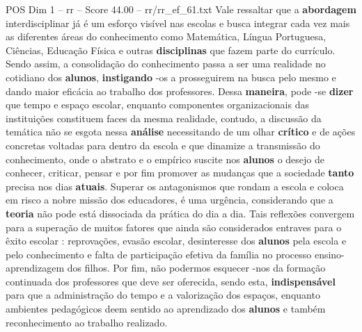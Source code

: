 \begin{textsample}{POS Dim 1 – rr – Score 44.00 – rr/rr\_ef\_61.txt}
Vale ressaltar que a \textbf{abordagem} interdisciplinar já é um esforço visível nas escolas e busca integrar cada vez mais as diferentes áreas do conhecimento como Matemática, Língua Portuguesa, Ciências, Educação Física e outras \textbf{disciplinas} que fazem parte do currículo.
Sendo assim, a consolidação do conhecimento passa a ser uma realidade no cotidiano dos \textbf{alunos}, \textbf{instigando} -os a prosseguirem na busca pelo mesmo e dando maior eficácia ao trabalho dos professores.
Dessa \textbf{maneira}, pode -se \textbf{dizer} que tempo e espaço escolar, enquanto componentes organizacionais das instituições constituem faces da mesma realidade, contudo, a discussão da temática não se esgota nessa \textbf{análise} necessitando de um olhar \textbf{crítico} e de ações concretas voltadas para dentro da escola e que dinamize a transmissão do conhecimento, onde o abstrato e o empírico suscite nos \textbf{alunos} o desejo de conhecer, criticar, pensar e por fim promover as mudanças que a sociedade \textbf{tanto} precisa nos dias \textbf{atuais}.
Superar os antagonismos que rondam a escola e coloca em risco a nobre missão dos educadores, é uma urgência, considerando que a \textbf{teoria} não pode está dissociada da prática do dia a dia.
Tais reflexões convergem para a superação de muitos fatores que ainda são considerados entraves para o êxito escolar : reprovações, evasão escolar, desinteresse dos \textbf{alunos} pela escola e pelo conhecimento e falta de participação efetiva da família no processo ensino-aprendizagem dos filhos.
Por fim, não podermos esquecer -nos da formação continuada dos professores que deve ser oferecida, sendo esta, \textbf{indispensável} para que a administração do tempo e a valorização dos espaços, enquanto ambientes pedagógicos deem sentido ao aprendizado dos \textbf{alunos} e também reconhecimento ao trabalho realizado.

\end{textsample}
